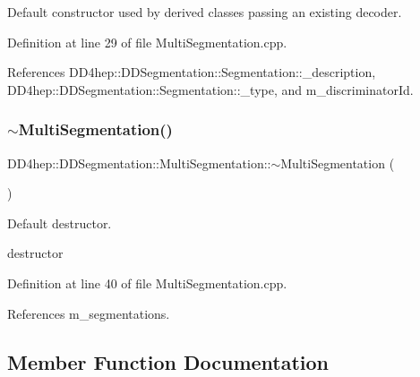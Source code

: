 Default constructor used by derived classes passing an existing decoder. 



Definition at line 29 of file Multi\+Segmentation.\+cpp.



References D\+D4hep\+::\+D\+D\+Segmentation\+::\+Segmentation\+::\+\_\+description, D\+D4hep\+::\+D\+D\+Segmentation\+::\+Segmentation\+::\+\_\+type, and m\+\_\+discriminator\+Id.

\hypertarget{class_d_d4hep_1_1_d_d_segmentation_1_1_multi_segmentation_ac59d1f2a2145181f48c0c7ffdd13a5ba}{}\label{class_d_d4hep_1_1_d_d_segmentation_1_1_multi_segmentation_ac59d1f2a2145181f48c0c7ffdd13a5ba} 
\subsubsection{\texorpdfstring{$\sim$\+Multi\+Segmentation()}{~MultiSegmentation()}}
{\footnotesize\ttfamily D\+D4hep\+::\+D\+D\+Segmentation\+::\+Multi\+Segmentation\+::$\sim$\+Multi\+Segmentation (\begin{DoxyParamCaption}{ }\end{DoxyParamCaption})\hspace{0.3cm}{\ttfamily [virtual]}}



Default destructor. 

destructor 

Definition at line 40 of file Multi\+Segmentation.\+cpp.



References m\+\_\+segmentations.



\subsection{Member Function Documentation}
\hypertarget{class_d_d4hep_1_1_d_d_segmentation_1_1_multi_segmentation_aa92e91f45ba11b074fd6cafb87e15325}{}\label{class_d_d4hep_1_1_d_d_segmentation_1_1_multi_segmentation_aa92e91f45ba11b074fd6cafb87e15325} 
